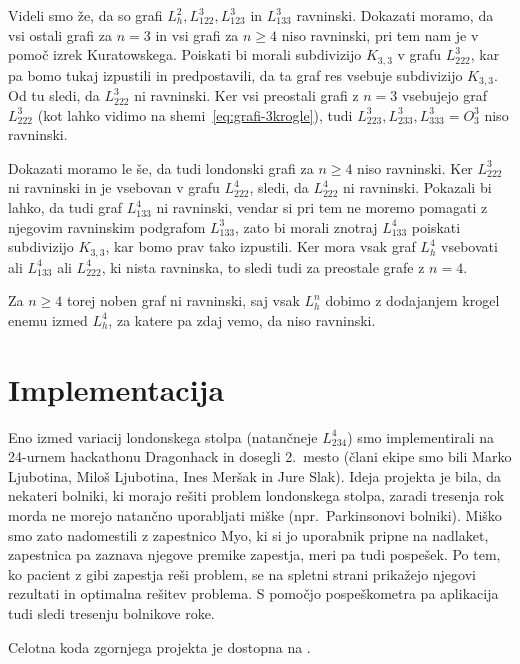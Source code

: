 \documentclass[twoside,11pt]{article}
\begin{document}
\begin{dokaz}
Videli smo že, da so grafi $L_h^2, L_{122}^3, L_{123}^3$ in $L_{133}^3$ ravninski. Dokazati moramo, da vsi ostali grafi za $n=3$ in vsi grafi za $n \geq 4$ niso ravninski, pri tem nam je v pomoč izrek Kuratowskega. Poiskati bi morali subdivizijo $K_{3,3}$ v grafu $L_{222}^3$, kar pa bomo tukaj izpustili in predpostavili, da ta graf res vsebuje subdivizijo $K_{3,3}$. Od tu sledi, da $L_{222}^3$ ni ravninski. Ker vsi preostali grafi z $n = 3$ vsebujejo graf $L_{222}^3$ (kot lahko vidimo na shemi~\eqref{eq:grafi-3krogle}), tudi $L_{223}^3, L_{233}^3, L_{333}^3=O^3_3$ niso ravninski.

Dokazati moramo le še, da tudi londonski grafi za $n\geq 4$ niso ravninski.
Ker $L_{222}^3$ ni ravninski in je vsebovan v grafu $L_{222}^4$, sledi, da $L_{222}^4$ ni ravninski. Pokazali bi lahko, da tudi graf $L_{133}^4$ ni ravninski, vendar si pri tem ne moremo pomagati z njegovim ravninskim podgrafom $L_{133}^3$, zato bi morali znotraj $L_{133}^4$ poiskati subdivizijo $K_{3,3}$, kar bomo prav tako izpustili.
Ker mora vsak graf $L_h^4$ vsebovati ali $L_{133}^4$ ali $L_{222}^4$, ki nista ravninska, to sledi tudi za preostale grafe z $n=4$.

Za $n \geq 4$ torej noben graf ni ravninski, saj vsak $L_h^n$ dobimo z dodajanjem krogel enemu izmed $L_h^4$, za katere pa zdaj vemo, da niso ravninski.
\end{dokaz}

\section{Implementacija}

Eno izmed variacij londonskega stolpa (natančneje $L^4_{234}$) smo implementirali na 24-urnem hackathonu Dragonhack in dosegli 2.\ mesto (člani ekipe smo bili Marko Ljubotina, Miloš Ljubotina, Ines Meršak in Jure Slak). Ideja projekta je bila, da nekateri bolniki, ki morajo rešiti problem londonskega stolpa, zaradi tresenja rok morda ne morejo natančno uporabljati miške (npr.\ Parkinsonovi bolniki). Miško smo zato nadomestili z zapestnico Myo, ki si jo uporabnik pripne na nadlaket, zapestnica pa zaznava njegove premike zapestja, meri pa tudi pospešek. Po tem, ko pacient z gibi zapestja reši problem, se na spletni strani prikažejo njegovi rezultati in optimalna rešitev problema. S pomočjo pospeškometra pa aplikacija tudi sledi tresenju bolnikove roke. 

Celotna koda zgornjega projekta je dostopna na \cite{bib:dragonhack}.
\end{document}
